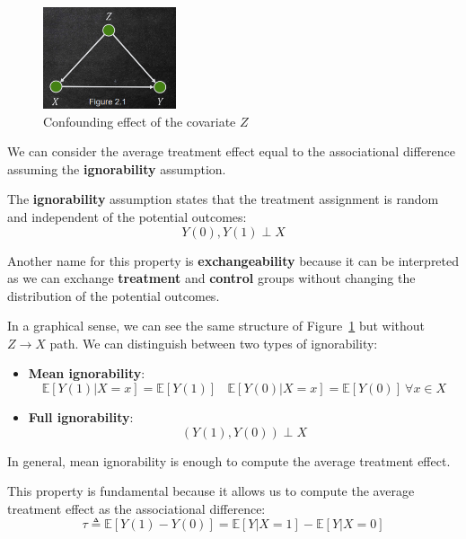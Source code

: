 \begin{figure}[!ht]
    \centering
    \includegraphics[width=0.35\textwidth]{img/potential_outcomes/confounding.png}
    \caption{Confounding effect of the covariate $Z$}
    \label{fig:confounding}
\end{figure}

We can consider the average treatment effect equal to the associational difference
assuming the \textbf{ignorability} assumption.
\begin{definition}
    The \textbf{ignorability} assumption states that the treatment assignment
    is random and independent of the potential outcomes:
    \begin{equation}
        Y(0), Y(1) \perp X
    \end{equation}
\end{definition}

Another name for this property is \textbf{exchangeability} because it can be
interpreted as we can exchange \textbf{treatment} and \textbf{control} groups
without changing the distribution of the potential outcomes.

In a graphical sense, we can see the same structure of Figure~\ref{fig:confounding}
but without $Z \to X$ path. We can distinguish between two types of ignorability:
\begin{itemize}
    \item \textbf{Mean ignorability}:
          \begin{equation*}
              \mathbb{E}[Y(1)|X = x]  =  \mathbb{E}[Y(1)]\ \ \ \
              \mathbb{E}[Y(0)|X = x]  =  \mathbb{E}[Y(0)] \ \forall x \in X
          \end{equation*}
    \item \textbf{Full ignorability}:
          \begin{equation*}
              (Y(1), Y(0))\perp X
          \end{equation*}
\end{itemize}
In general, mean ignorability is enough to compute the average treatment effect.

This property is fundamental because it allows us to compute the average treatment
effect as the associational difference:
\begin{equation}
    \tau \triangleq \mathbb{E}[Y(1) - Y(0)] = \mathbb{E}[Y|X = 1] - \mathbb{E}[Y|X = 0]
\end{equation}

